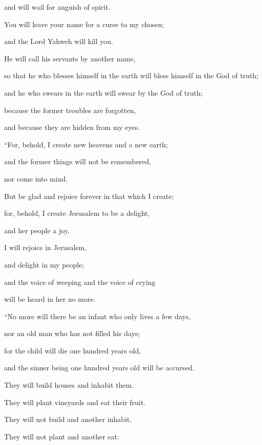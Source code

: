 {\par }{\QB and will wail for anguish of spirit.
\par }{\Q {}You will leave your name for a curse to my chosen;
\par }{\QB and the Lord Yahweh will kill you.
\par }{\Q He will call his servants by another name,
\par }{\QB {}so that he who blesses himself in the earth will bless himself in the God of truth;
\par }{\QB and he who swears in the earth will swear by the God of truth;
\par }{\Q because the former troubles are forgotten,
\par }{\QB and because they are hidden from my eyes.
\par }{\BB \par }{\Q {}“For, behold, I create new heavens and a new earth;
\par }{\QB and the former things will not be remembered,
\par }{\QB nor come into mind.
\par }{\Q {}But be glad and rejoice forever in that which I create;
\par }{\QB for, behold, I create Jerusalem to be a delight,
\par }{\QB and her people a joy.
\par }{\Q {}I will rejoice in Jerusalem,
\par }{\QB and delight in my people;
\par }{\Q and the voice of weeping and the voice of crying
\par }{\QB will be heard in her no more.
\par }{\BB \par }{\Q {}“No more will there be an infant who only lives a few days,
\par }{\QB nor an old man who has not filled his days;
\par }{\Q for the child will die one hundred years old,
\par }{\QB and the sinner being one hundred years old will be accursed.
\par }{\Q {}They will build houses and inhabit them.
\par }{\QB They will plant vineyards and eat their fruit.
\par }{\Q {}They will not build and another inhabit.
\par }{\QB They will not plant and another eat:
}
